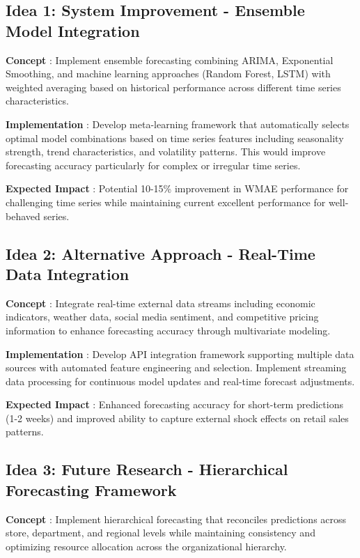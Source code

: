 \subsection{Idea 1: System Improvement - Ensemble Model Integration}

\textbf{Concept }: Implement ensemble forecasting combining ARIMA, Exponential Smoothing, and machine learning approaches (Random Forest, LSTM) with weighted averaging based on historical performance across different time series characteristics.

\textbf{Implementation }: Develop meta-learning framework that automatically selects optimal model combinations based on time series features including seasonality strength, trend characteristics, and volatility patterns. This would improve forecasting accuracy particularly for complex or irregular time series.

\textbf{Expected Impact }: Potential 10-15\% improvement in WMAE performance for challenging time series while maintaining current excellent performance for well-behaved series.

\subsection{Idea 2: Alternative Approach - Real-Time Data Integration}

\textbf{Concept }: Integrate real-time external data streams including economic indicators, weather data, social media sentiment, and competitive pricing information to enhance forecasting accuracy through multivariate modeling.

\textbf{Implementation }: Develop API integration framework supporting multiple data sources with automated feature engineering and selection. Implement streaming data processing for continuous model updates and real-time forecast adjustments.

\textbf{Expected Impact }: Enhanced forecasting accuracy for short-term predictions (1-2 weeks) and improved ability to capture external shock effects on retail sales patterns.

\subsection{Idea 3: Future Research - Hierarchical Forecasting Framework}

\textbf{Concept }: Implement hierarchical forecasting that reconciles predictions across store, department, and regional levels while maintaining consistency and optimizing resource allocation across the organizational hierarchy.

